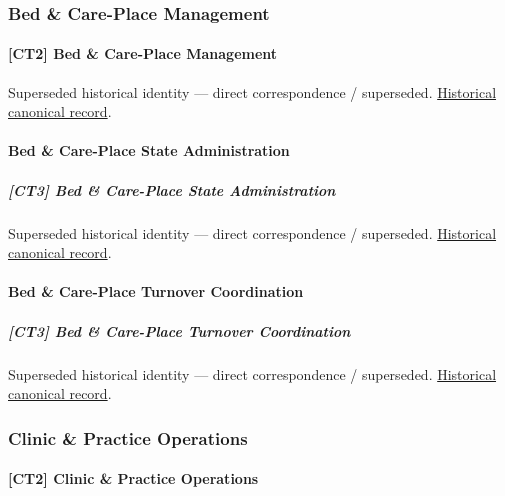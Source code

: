 \subsubsection{Bed \& Care-Place Management}

\paragraph{[CT2] Bed \& Care-Place Management}

\par\label{element:c94d29b7d1c045dabc7814ceea795484}
Superseded historical identity — direct correspondence / superseded. \href{../../../../continuum/strategy/capability/c94d29b7d1c045dabc7814ceea795484.md}{Historical canonical record}.\par

\paragraph{Bed \& Care-Place State Administration}

\subparagraph{[CT3] Bed \& Care-Place State Administration}

\par\label{element:dd2e2ee1a68845c087ba93610752181b}
Superseded historical identity — direct correspondence / superseded. \href{../../../../continuum/strategy/capability/dd2e2ee1a68845c087ba93610752181b.md}{Historical canonical record}.\par

\paragraph{Bed \& Care-Place Turnover Coordination}

\subparagraph{[CT3] Bed \& Care-Place Turnover Coordination}

\par\label{element:a50662edda954bc58c44184d84591d5b}
Superseded historical identity — direct correspondence / superseded. \href{../../../../continuum/strategy/capability/a50662edda954bc58c44184d84591d5b.md}{Historical canonical record}.\par

\subsubsection{Clinic \& Practice Operations}

\paragraph{[CT2] Clinic \& Practice Operations}

